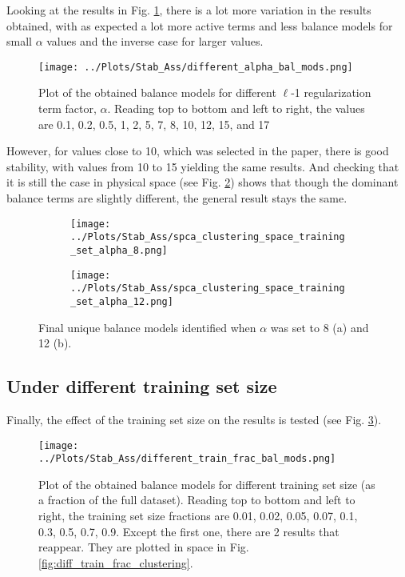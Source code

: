 \documentclass[12pt]{report} %
\begin{document}
\newpage

Looking at the results in Fig. \ref{fig:diff_alpha_bal_mods}, there is a lot more variation in the results obtained, with as expected a lot more active terms and less balance models for small $\alpha$ values and the inverse case for larger values.

\begin{figure}[htbp]
  \centering
  \texttt{[image: ../Plots/Stab\_Ass/different\_alpha\_bal\_mods.png]}
  \caption{Plot of the obtained balance models for different $\ell$-1 regularization term factor, $\alpha$. Reading top to bottom and left to right, the values are 0.1, 0.2, 0.5, 1, 2, 5, 7, 8, 10, 12, 15, and 17}
  \label{fig:diff_alpha_bal_mods}
\end{figure}

However, for values close to 10, which was selected in the paper, there is good stability, with values from 10 to 15 yielding the same results. And checking that it is still the case in physical space (see Fig. \ref{fig:diif_alpha_clustering}) shows that though the dominant balance terms are slightly different, the general result stays the same.

\begin{figure}[htbp]
  \centering
  \begin{subfigure}[b]{0.7\textwidth}
      \texttt{[image: ../Plots/Stab\_Ass/spca\_clustering\_space\_training\_set\_alpha\_8.png]}
      \caption{}
  \end{subfigure}
  \begin{subfigure}[b]{0.7\textwidth}
      \texttt{[image: ../Plots/Stab\_Ass/spca\_clustering\_space\_training\_set\_alpha\_12.png]}
      \caption{}
  \end{subfigure}
  \caption{Final unique balance models identified when $\alpha$ was set to 8 (a) and 12 (b).}
  \label{fig:diif_alpha_clustering}
\end{figure}

\subsection{Under different training set size}

Finally, the effect of the training set size on the results is tested (see Fig. \ref{fig:diff_train_frac_bal_mods}).

\begin{figure}[htbp]
  \centering
  \texttt{[image: ../Plots/Stab\_Ass/different\_train\_frac\_bal\_mods.png]}
  \caption{Plot of the obtained balance models for different training set size (as a fraction of the full dataset). Reading top to bottom and left to right, the training set size fractions are 0.01, 0.02, 0.05, 0.07, 0.1, 0.3, 0.5, 0.7, 0.9. Except the first one, there are 2 results that reappear. They are plotted in space in Fig. \ref{fig:diff_train_frac_clustering}.}
  \label{fig:diff_train_frac_bal_mods}
\end{figure}
\end{document}
